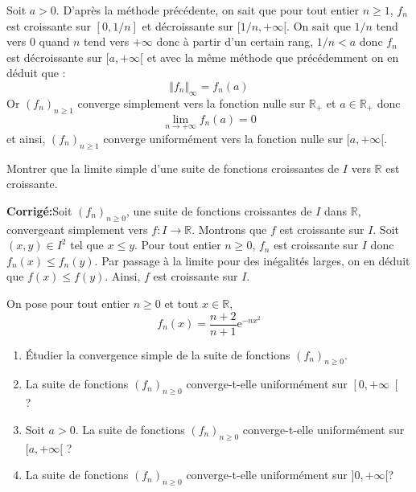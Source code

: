 \documentclass[a4paper,twoside,french,11pt]{VcCours}
\newcommand{\corr}{\textbf{Corrigé:}}
\begin{document}
\begin{enumerate}
Soit $a>0$. D'après la méthode précédente, on sait que pour tout entier $n \geq 1$, $f_n$ est croissante sur $[0,1/n]$ et décroissante sur $[1/n, + \infty[$. On sait que $1/n$ tend vers $0$ quand $n$ tend vers $+ \infty$ donc à partir d'un certain rang, $1/n<a$ donc $f_n$ est décroissante sur $[a, + \infty[$ et avec la même méthode que précédemment on en déduit que :
$$  \Vert f_n \Vert_{\infty} = f_n(a)$$
Or $(f_n)_{n \geq 1}$ converge simplement vers la fonction nulle sur $\mathbb{R}_+$ et $a \in \mathbb{R}_+$ donc 
$$ \lim_{n \rightarrow + \infty} f_n(a) = 0$$
et ainsi, $(f_n)_{n \geq 1}$ converge uniformément vers la fonction nulle sur $[a, + \infty[$.

\end{enumerate}

\medskip


\begin{Exercice}{} Montrer que la limite simple d'une suite de fonctions croissantes de $I$ vers $\mathbb{R}$ est croissante.
\end{Exercice}

\corr Soit $(f_n)_{n \geq 0}$, une suite de fonctions croissantes de $I$ dans $\mathbb{R}$, convergeant simplement vers $f : I \rightarrow \mathbb{R}$. Montrons que $f$ est croissante sur $I$. Soit $(x,y) \in I^2$ tel que $x \leq y$. Pour tout entier $n \geq 0$, $f_n$ est croissante sur $I$ donc $f_n(x) \leq f_n(y)$. Par passage à la limite pour des inégalités larges, on en déduit que $f(x) \leq f(y)$. Ainsi, $f$ est croissante sur $I$.

\medskip

\begin{Exercice}{} On pose pour tout entier $n \geq 0$ et tout $x \in \mathbb{R}$,
$$f_{n}(x) =\dfrac{n+2}{n+1}\mathrm{e}^{-n x^{2}}$$
\begin{enumerate}
\item \'Etudier la convergence simple de la suite de fonctions $\left(f_{n}\right) _{n \geq 0}$.
\item La suite de fonctions  $\left(f_{n}\right) _{n \geq 0}$ converge-t-elle uniformément sur $\left[ 0,+\infty\right[$ ?
\item Soit $a>0$. La suite de fonctions $\left(f_{n}\right) _{n \geq 0}$ converge-t-elle uniformément sur  $[a,+\infty[$ ?	
\item La suite de fonctions  $\left(f_{n}\right) _{n \geq 0}$ converge-t-elle uniformément sur $]0,+\infty[$? 
\end{enumerate}
\end{Exercice}
\end{document}
